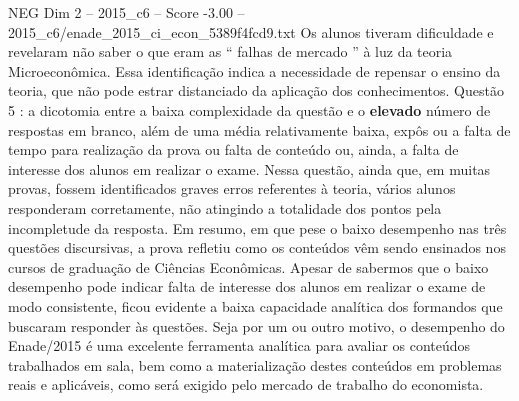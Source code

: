 \begin{textsample}{NEG Dim 2 – 2015\_c6 – Score -3.00 – 2015\_c6/enade\_2015\_ci\_econ\_5389f4fcd9.txt}
Os alunos tiveram dificuldade e revelaram não saber o que eram as “ falhas de mercado ” à luz da teoria Microeconômica.
Essa identificação indica a necessidade de repensar o ensino da teoria, que não pode estrar distanciado da aplicação dos conhecimentos.
Questão 5 : a dicotomia entre a baixa complexidade da questão e o \textbf{elevado} número de respostas em branco, além de uma média relativamente baixa, expôs ou a falta de tempo para realização da prova ou falta de conteúdo ou, ainda, a falta de interesse dos alunos em realizar o exame.
Nessa questão, ainda que, em muitas provas, fossem identificados graves erros referentes à teoria, vários alunos responderam corretamente, não atingindo a totalidade dos pontos pela incompletude da resposta.
Em resumo, em que pese o baixo desempenho nas três questões discursivas, a prova refletiu como os conteúdos vêm sendo ensinados nos cursos de graduação de Ciências Econômicas.
Apesar de sabermos que o baixo desempenho pode indicar falta de interesse dos alunos em realizar o exame de modo consistente, ficou evidente a baixa capacidade analítica dos formandos que buscaram responder às questões.
Seja por um ou outro motivo, o desempenho do Enade/2015 é uma excelente ferramenta analítica para avaliar os conteúdos trabalhados em sala, bem como a materialização destes conteúdos em problemas reais e aplicáveis, como será exigido pelo mercado de trabalho do economista.

\end{textsample}
